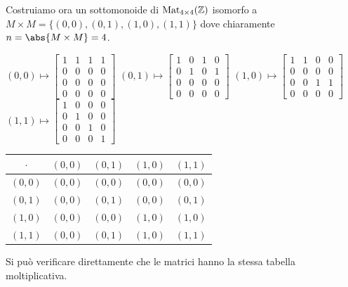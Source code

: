 \documentclass[../main.tex]{subfiles}
\begin{document}
\begin{example}
    Costruiamo ora un sottomonoide di $\operatorname{Mat}_{4 \times 4}(\mathbb{Z})$ isomorfo a $M \times M = \{(0,0), (0,1), (1,0), (1,1)\}$ dove chiaramente $n = \abs{M \times M} = 4$.
    \vspace*{1em}
    \begin{center}
        $(0,0) \mapsto
            \begin{bmatrix}
                1 & 1 & 1 & 1 \\
                0 & 0 & 0 & 0 \\
                0 & 0 & 0 & 0 \\
                0 & 0 & 0 & 0
            \end{bmatrix}$
        $(0,1) \mapsto \begin{bmatrix}
                1 & 0 & 1 & 0 \\
                0 & 1 & 0 & 1 \\
                0 & 0 & 0 & 0 \\
                0 & 0 & 0 & 0
            \end{bmatrix}$
        $(1,0) \mapsto \begin{bmatrix}
                1 & 1 & 0 & 0 \\
                0 & 0 & 0 & 0 \\
                0 & 0 & 1 & 1 \\
                0 & 0 & 0 & 0
            \end{bmatrix}$
        $(1,1) \mapsto \begin{bmatrix}
                1 & 0 & 0 & 0 \\
                0 & 1 & 0 & 0 \\
                0 & 0 & 1 & 0 \\
                0 & 0 & 0 & 1
            \end{bmatrix}$
    \end{center}
    \vspace*{1em}
    \begin{center}
        \begin{tabular}{c|c|c|c|c}
            $\cdot$ & $(0,0)$ & $(0,1)$ & $(1,0)$ & $(1,1)$ \\ \hline
            $(0,0)$ & $(0,0)$ & $(0,0)$ & $(0,0)$ & $(0,0)$ \\ \hline
            $(0,1)$ & $(0,0)$ & $(0,1)$ & $(0,0)$ & $(0,1)$ \\ \hline
            $(1,0)$ & $(0,0)$ & $(0,0)$ & $(1,0)$ & $(1,0)$ \\ \hline
            $(1,1)$ & $(0,0)$ & $(0,1)$ & $(1,0)$ & $(1,1)$ \\
        \end{tabular}
    \end{center}
    \vspace*{1em}
    Si può verificare direttamente che le matrici hanno la stessa tabella moltiplicativa.
\end{example}
\end{document}
